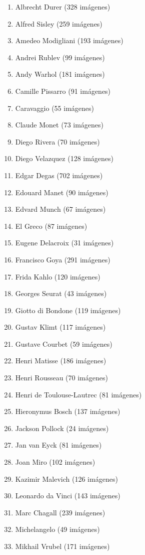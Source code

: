 \documentclass[../main.tex]{subfiles}
\begin{document}
\begin{enumerate}
    \item Albrecht Durer (328 imágenes)
    \item Alfred Sisley (259 imágenes)
    \item Amedeo Modigliani (193 imágenes)
    \item Andrei Rublev (99 imágenes)
    \item Andy Warhol (181 imágenes)
    \item Camille Pissarro (91 imágenes)
    \item Caravaggio (55 imágenes)
    \item Claude Monet (73 imágenes)
    \item Diego Rivera (70 imágenes)
    \item Diego Velazquez (128 imágenes)
    \item Edgar Degas (702 imágenes)
    \item Edouard Manet (90 imágenes)
    \item Edvard Munch (67 imágenes)
    \item El Greco (87 imágenes)
    \item Eugene Delacroix (31 imágenes)
    \item Francisco Goya (291 imágenes)
    \item Frida Kahlo (120 imágenes)
    \item Georges Seurat (43 imágenes)
    \item Giotto di Bondone (119 imágenes)
    \item Gustav Klimt (117 imágenes)
    \item Gustave Courbet (59 imágenes)
    \item Henri Matisse (186 imágenes)
    \item Henri Rousseau (70 imágenes)
    \item Henri de Toulouse-Lautrec (81 imágenes)
    \item Hieronymus Bosch (137 imágenes)
    \item Jackson Pollock (24 imágenes)
    \item Jan van Eyck (81 imágenes)
    \item Joan Miro (102 imágenes)
    \item Kazimir Malevich (126 imágenes)
    \item Leonardo da Vinci (143 imágenes)
    \item Marc Chagall (239 imágenes)
    \item Michelangelo (49 imágenes)
    \item Mikhail Vrubel (171 imágenes)

\end{enumerate}
\end{document}

